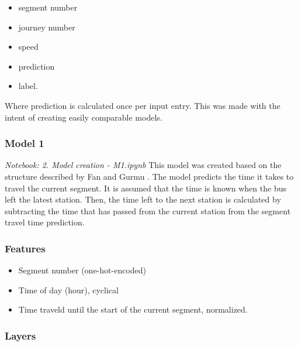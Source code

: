 \begin{itemize}
    \item segment number
    \item journey number
    \item speed
    \item prediction
    \item label.
\end{itemize}

Where prediction is calculated once per input entry. This was made with the intent of creating easily comparable models.


\subsubsection{Model 1}
\textit{Notebook: 2. Model creation - M1.ipynb}
\newline
\noindent This model was created based on the structure described by Fan and Gurmu \cite{brazilANN}. The model predicts the time it takes to travel the current segment. It is assumed that the time is known when the bus left the latest station. Then, the time left to the next station is calculated by subtracting the time that has passed from the current station from the segment travel time prediction.

\subsubsection{Features}

\begin{itemize}
    \item Segment number (one-hot-encoded)
    \item Time of day (hour), cyclical
    \item Time traveld until the start of the current segment, normalized.
\end{itemize}



\subsubsection{Layers}


